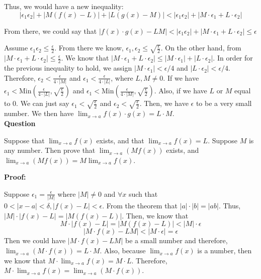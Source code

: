 \documentclass[a4paper,12pt]{report}
\begin{document}
\noindent
Thus, we would have a new inequality:
\[|\epsilon_1\epsilon_2|+|M(f(x)-L)|+|L(g(x)-M)|<|\epsilon_1\epsilon_2|+|M\cdot{\epsilon_1}+L\cdot{\epsilon_2}|\]

\noindent
From there, we could say that $|f(x)\cdot{g(x)}-LM|<|\epsilon_1\epsilon_2|+|M\cdot{\epsilon_1}+L\cdot{\epsilon_2}|\leq \epsilon$

\noindent
Assume $\epsilon_1\epsilon_2\leq \frac{\epsilon}{2}$. From there we know, $\epsilon_1, \epsilon_2 \leq \sqrt{\frac{\epsilon}{2}}$. On the other hand, from $|M\cdot{\epsilon_1}+L\cdot{\epsilon_2}|\leq \frac{\epsilon}{2}$. We know that $|M\cdot{\epsilon_1}+L\cdot{\epsilon_2}|\leq |M\cdot{\epsilon_1}|+|L\cdot{\epsilon_2}|$. In order for the previous inequality to hold, we assign $|M\cdot{\epsilon_1}|<\epsilon/4$ and $|L\cdot{\epsilon_2}|<\epsilon/4$. Therefore, $\epsilon_2<\frac{\epsilon}{4\cdot{|M|}}$ and $\epsilon_1<\frac{\epsilon}{4\cdot{|L|}}$, where $L,M\neq 0$. If we have $\epsilon_1<\text{Min}(\frac{\epsilon}{4\cdot{|L|}}, \sqrt{\frac{\epsilon}{2}})$ and $\epsilon_1<\text{Min}(\frac{\epsilon}{4\cdot{|M|}}, \sqrt{\frac{\epsilon}{2}})$. Also, if we have $L$ or $M$ equal to 0. We can just say $\epsilon_1 < \sqrt{\frac{\epsilon}{2}}$ and $\epsilon_2 < \sqrt{\frac{\epsilon}{2}}$. Then, we have $\epsilon$ to be a very small number. We then have $\lim_{x\to a} f(x)\cdot{g(x)}=L\cdot{M}$.\\

\noindent
\textbf{Question}

\noindent
Suppose that $\displaystyle{\lim_{x\to a}}f(x)$
exists, and that
$\displaystyle{\lim_{x\to a}}f(x)=L$. Suppose $M$ is any 
number.
Then prove that $\displaystyle{\lim_{x\to a}}(Mf(x))$
exists, and $\displaystyle{\lim_{x\to a}}(Mf(x))=M\displaystyle{\lim_{x\to a}}f(x)$.

\noindent
\textbf{Proof: }

\noindent
Suppose $\epsilon_1=\frac{\epsilon}{|M|}$ where $|M|\neq 0$ and $\forall x $ such that $0<|x-a|<\delta, |f(x)-L|< \epsilon$. From the theorem that $|a|\cdot{|b|}=|ab|$. Thus, $|M|\cdot{|f(x)-L|}=|M(f(x)-L)|$. Then, we know that 
\[M\cdot{|f(x)-L|}=|M(f(x)-L)|<|M|\cdot{\epsilon}\]
\[|M\cdot{f(x)}-LM|<|M\cdot{\epsilon}|=\epsilon\]
Then we could have $|M\cdot{f(x)}-LM|$ be a small number and therefore, $\lim_{x\to a}(M\cdot{f(x)})=L\cdot{M}$. Also, because $\lim_{x\to a}f(x)$ is a number, then we know that $M\cdot{\lim_{x\to a}f(x)}=M\cdot{L}$. Therefore, $M\cdot{\lim_{x\to a}f(x)}=\lim_{x\to a}(M\cdot{f(x)})$.
\end{document}
